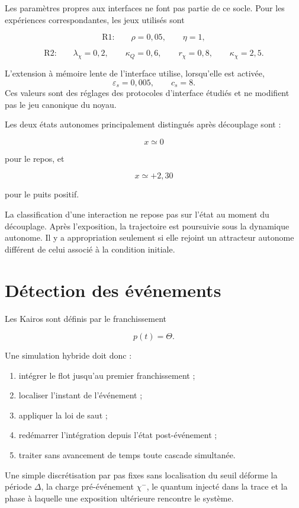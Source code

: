 Les paramètres propres aux interfaces ne font pas partie de ce socle.
Pour les expériences correspondantes, les jeux utilisés sont

\[
\text{R1:}\qquad \rho=0{,}05,\qquad \eta=1,
\]

\[
\text{R2:}\qquad
\lambda_\chi=0{,}2,\qquad
\kappa_Q=0{,}6,\qquad
r_\chi=0{,}8,\qquad
\kappa_\chi=2{,}5.
\]

L'extension à mémoire lente de l'interface utilise, lorsqu'elle est
activée,
\[
\varepsilon_s=0{,}005,
\qquad
c_s=8.
\]
Ces valeurs sont des réglages des protocoles d'interface étudiés et ne
modifient pas le jeu canonique du noyau.

Les deux états autonomes principalement distingués après découplage
sont :

\[
x\simeq0
\]

pour le repos, et

\[
x\simeq+2{,}30
\]

pour le puits positif.

La classification d'une interaction ne repose pas sur l'état au moment
du découplage. Après l'exposition, la trajectoire est poursuivie sous
la dynamique autonome. Il y a appropriation seulement si elle rejoint
un attracteur autonome différent de celui associé à la condition
initiale.

\section{Détection des événements}
\label{annexe-num-detection-evenements}

Les Kairos sont définis par le franchissement

\[
p(t)=\Theta.
\]

Une simulation hybride doit donc :

\begin{enumerate}
\item intégrer le flot jusqu'au premier franchissement ;
\item localiser l'instant de l'événement ;
\item appliquer la loi de saut ;
\item redémarrer l'intégration depuis l'état post-événement ;
\item traiter sans avancement de temps toute cascade simultanée.
\end{enumerate}

Une simple discrétisation par pas fixes sans localisation du seuil
déforme la période \(\Delta\), la charge pré-événement \(\chi^-\), le
quantum injecté dans la trace et la phase à laquelle une exposition
ultérieure rencontre le système.

